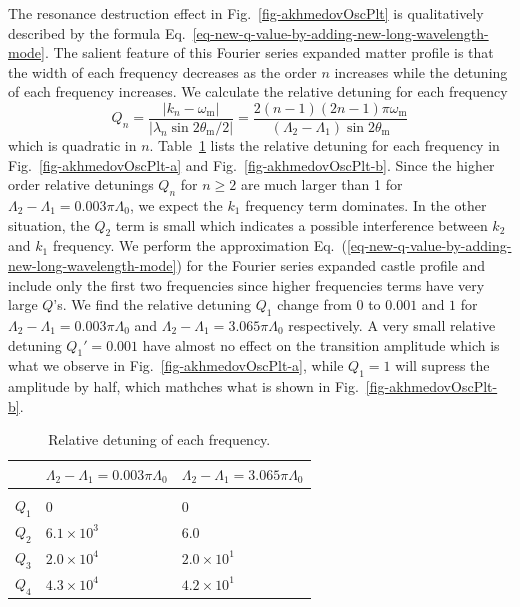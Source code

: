 \documentclass[%
reprint,
 amsmath,amssymb,
 aps,
]{revtex4-1}
\begin{document}
The resonance destruction effect in Fig.~\ref{fig-akhmedovOscPlt} is qualitatively described by the formula Eq.~\ref{eq-new-q-value-by-adding-new-long-wavelength-mode}. The salient feature of this Fourier series expanded matter profile is that the width of each frequency decreases as the order $n$ increases while the detuning of each frequency increases. We calculate the relative detuning for each frequency
\begin{equation}
Q_n = \frac{\lvert k_n -\omega_{\mathrm m} \rvert}{ \lvert \lambda_n  \sin 2\theta_{\mathrm m}/2 \rvert } = \frac{2(n-1)(2n-1)\pi \omega_{\mathrm m}}{(\Lambda_2 - \Lambda_1)\sin 2\theta_{\mathrm m}}
\end{equation}
which is quadratic in $n$. Table~\ref{tab-q-values-each-mode} lists the relative detuning for each frequency in Fig.~\ref{fig-akhmedovOscPlt-a} and Fig.~\ref{fig-akhmedovOscPlt-b}. Since the higher order relative detunings $Q_n$ for $n\geq 2$ are much larger than 1 for $\Lambda_2-\Lambda_1 = 0.003\pi\Lambda_0$, we expect the $k_1$ frequency term dominates. In the other situation, the $Q_2$ term is small which indicates a possible interference between $k_2$ and $k_1$ frequency. We perform the approximation Eq.~(\ref{eq-new-q-value-by-adding-new-long-wavelength-mode}) for the Fourier series expanded castle profile and include only the first two frequencies since higher frequencies terms have very large $Q$'s. We find the relative detuning $Q_1$ change from $0$ to $0.001$ and $1$ for $\Lambda_2-\Lambda_1 = 0.003\pi\Lambda_0$ and $\Lambda_2-\Lambda_1 =3.065\pi\Lambda_0$ respectively. A very small relative detuning $Q_1'=0.001$ have almost no effect on the transition amplitude which is what we observe in Fig.~\ref{fig-akhmedovOscPlt-a}, while $Q_1=1$ will supress the amplitude by half, which mathches what is shown in Fig.~\ref{fig-akhmedovOscPlt-b}.




\begin{table}
\caption{\label{tab-q-values-each-mode}Relative detuning of each frequency.} 
\begin{ruledtabular} 
\begin{tabular}{lll} 
  & $\Lambda_2-\Lambda_1 = 0.003\pi\Lambda_0$ & $\Lambda_2-\Lambda_1 =3.065\pi\Lambda_0$ \\
\hline \\
 $Q_1$ & $0$ &  $0$ \\ 
 $Q_2$ & $6.1\times 10^3$ &  $6.0$ \\ 
 $Q_3$ & $2.0\times 10^4$ &  $2.0\times 10^1$ \\ 
 $Q_4$ & $4.3\times 10^4$ &  $4.2\times 10^1$ 
\end{tabular} 
\end{ruledtabular} 
\end{table}
\end{document}
